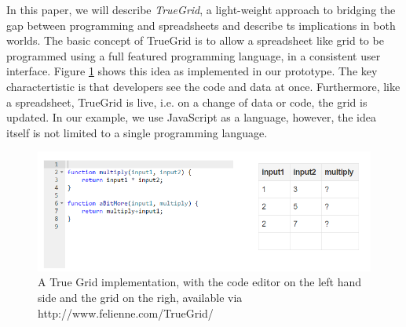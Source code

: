 \documentclass{llncs}
\begin{document}


 
In this paper, we will describe \textit{TrueGrid}, a light-weight approach to bridging the gap between programming and spreadsheets and describe ts implications in both worlds. The basic concept of TrueGrid is to allow a spreadsheet like grid to be programmed using a full featured programming language, in a consistent user interface. Figure \ref{fig:TG} shows this idea as implemented in our prototype. 
The key charactertistic is that  developers see the code and data at once. Furthermore, like a spreadsheet, TrueGrid is live, i.e. on a change of data or code, the grid is updated.
In our example, we use JavaScript as a language, however, the idea itself is not limited to a single programming language.

\begin{figure}
  \begin{center}
  \includegraphics[width=12cm]{fig/TG.png}
  \caption{A True Grid implementation, with the code editor on the left hand side and the grid on the righ, available via http://www.felienne.com/TrueGrid/}
  \label{fig:TG}
  \end{center}
\end{figure} 
\end{document}
